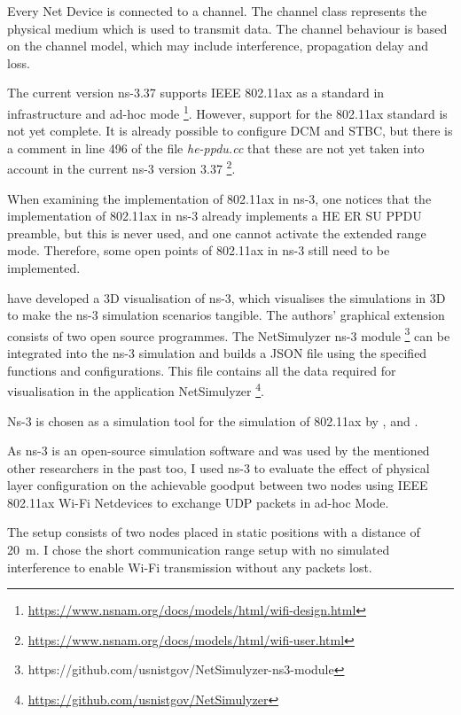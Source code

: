 Every Net Device is connected to a channel.
The channel class represents the physical medium which is used to transmit data.
The channel behaviour is based
on the channel model, which may include interference, propagation delay and loss.

The current version ns-3.37 supports IEEE 802.11ax as a standard in infrastructure and ad-hoc mode \footnote{\url{https://www.nsnam.org/docs/models/html/wifi-design.html}}.
However, support for the 802.11ax standard is not yet complete.
It is already possible to configure \ac{DCM} and \ac{STBC},
but there is a comment in line 496 of the file \textit{he-ppdu.cc} that these are
not yet taken into account in the current ns-3 version 3.37 \footnote{\url{https://www.nsnam.org/docs/models/html/wifi-user.html}}.

When examining the implementation of 802.11ax in ns-3, one notices that the implementation of 802.11ax in ns-3 already implements a \ac{HE} \ac{ER} SU \ac{PPDU} preamble, but this is never used, and one cannot activate the extended range mode.
Therefore, some open points of 802.11ax in ns-3 still need to be implemented.

\textcite{black_netsimulyzer_2021} have developed a 3D visualisation of ns-3, which visualises the simulations in 3D to make the ns-3 simulation
scenarios tangible.
The authors' graphical extension consists of two open source programmes.
The NetSimulyzer ns-3 module \footnote{https://github.com/usnistgov/NetSimulyzer-ns3-module} can be integrated into the ns-3 simulation and builds a JSON file using the specified functions and configurations.
This file contains all the data required for visualisation in the application NetSimulyzer \footnote{\url{https://github.com/usnistgov/NetSimulyzer}}.


Ns-3 is chosen as a simulation tool for the simulation of 802.11ax by \cite{dolinska_new_2019}, \cite{rochim_performance_2020} and
\cite{behara_performance_2022}.


As ns-3 is an open-source simulation software and was used by the mentioned other researchers in the past too, I used ns-3
to evaluate the effect of physical layer configuration on the achievable goodput between two nodes using IEEE 802.11ax Wi-Fi Netdevices
to exchange \ac{UDP} packets in ad-hoc Mode.

The setup consists of two nodes placed in static positions with a distance of \SI{20}{\metre}.
I chose the short communication range setup with no simulated interference to enable Wi-Fi transmission without any packets lost.

